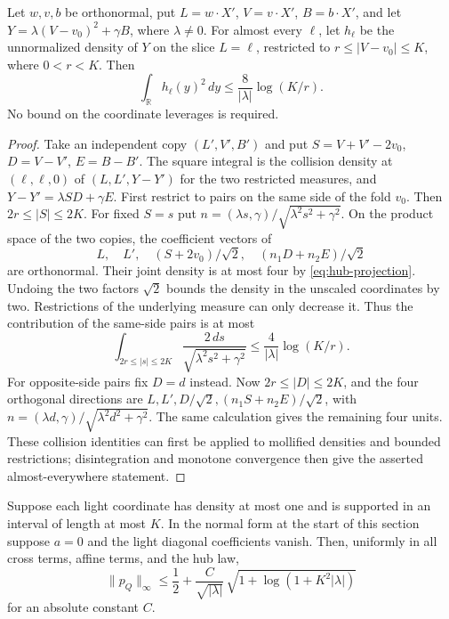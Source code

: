 \begin{lemma}\label{lem:hub-shell}
Let $w,v,b$ be orthonormal, put $L=w\cdot X'$, $V=v\cdot X'$,
$B=b\cdot X'$, and let
$Y=\lambda(V-v_0)^2+\gamma B$, where $\lambda\ne0$.
For almost every $\ell$, let $h_\ell$ be the unnormalized density
of $Y$ on the slice $L=\ell$, restricted to
$r\le |V-v_0|\le K$, where $0<r<K$.  Then
\[
 \int_{\mathbb R}h_\ell(y)^2\,dy
 \le \frac8{|\lambda|}\log(K/r).
\]
No bound on the coordinate leverages is required.
\end{lemma}

\begin{proof}
Take an independent copy $(L',V',B')$ and put
$S=V+V'-2v_0$, $D=V-V'$, $E=B-B'$.
The square integral is the collision density at $(\ell,\ell,0)$
of $(L,L',Y-Y')$ for the two restricted measures, and
$Y-Y'=\lambda SD+\gamma E$.
First restrict to pairs on the same side of the fold $v_0$.
Then $2r\le |S|\le2K$.  For fixed $S=s$ put
$n=(\lambda s,\gamma)/\sqrt{\lambda^2s^2+\gamma^2}$.
On the product space of the two copies, the coefficient vectors of
\[
 L,\quad L',\quad (S+2v_0)/\sqrt2,\quad (n_1D+n_2E)/\sqrt2
\]
are orthonormal.  Their joint density is at most four by
\eqref{eq:hub-projection}.  Undoing the two factors $\sqrt2$ bounds
the density in the unscaled coordinates by two.  Restrictions of
the underlying measure can only decrease it.  Thus the contribution
of the same-side pairs is at most
\[
 \int_{2r\le |s|\le2K}
       \frac{2\,ds}{\sqrt{\lambda^2s^2+\gamma^2}}
 \le\frac4{|\lambda|}\log(K/r).
\]
For opposite-side pairs fix $D=d$ instead.  Now
$2r\le |D|\le2K$, and the four orthogonal directions are
$L,L',D/\sqrt2,(n_1S+n_2E)/\sqrt2$, with
$n=(\lambda d,\gamma)/\sqrt{\lambda^2d^2+\gamma^2}$.
The same calculation gives the remaining four units.
These collision identities can first be applied to mollified
densities and bounded restrictions; disintegration and monotone
convergence then give the asserted almost-everywhere statement.
\end{proof}

\begin{theorem}
\label{thm:hub-shell-support}
Suppose each light coordinate has density at most one and is
supported in an interval of length at most $K$.  In the normal form
at the start of this section suppose $a=0$ and the light diagonal
coefficients vanish.  Then, uniformly in all cross terms, affine
terms, and the hub law,
\[
 \|p_Q\|_\infty
 \le \frac12+\frac{C}{\sqrt{|\lambda|}}\,
              \sqrt{1+\log(1+K^2|\lambda|)}
\]
for an absolute constant $C$.
\end{theorem}

